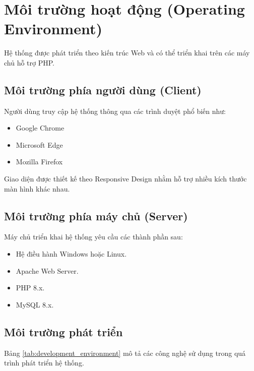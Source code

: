 
\section{Môi trường hoạt động (Operating Environment)}

Hệ thống được phát triển theo kiến trúc Web và có thể triển khai trên các máy chủ hỗ trợ PHP.

\subsection{Môi trường phía người dùng (Client)}

Người dùng truy cập hệ thống thông qua các trình duyệt phổ biến như:

\begin{itemize}
    \item Google Chrome
    \item Microsoft Edge
    \item Mozilla Firefox
\end{itemize}

Giao diện được thiết kế theo Responsive Design nhằm hỗ trợ nhiều kích thước màn hình khác nhau.

\subsection{Môi trường phía máy chủ (Server)}

Máy chủ triển khai hệ thống yêu cầu các thành phần sau:

\begin{itemize}
    \item Hệ điều hành Windows hoặc Linux.
    \item Apache Web Server.
    \item PHP 8.x.
    \item MySQL 8.x.
\end{itemize}

\subsection{Môi trường phát triển}

Bảng \ref{tab:development_environment} mô tả các công nghệ sử dụng trong quá trình phát triển hệ thống.

